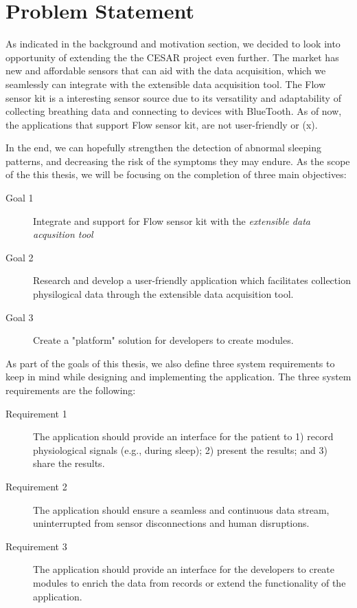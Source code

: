 \section{Problem Statement}

As indicated in the background and motivation section, we decided to look into opportunity of extending the the CESAR project even further. The market has new and affordable sensors that can aid with the data acquisition, which we seamlessly can integrate with the extensible data acquisition tool. The Flow sensor kit is a interesting sensor source due to its versatility and adaptability of collecting breathing data and connecting to devices with BlueTooth. As of now, the applications that support Flow sensor kit, are not user-friendly or (x). 

In the end, we can hopefully strengthen the detection of abnormal sleeping patterns, and decreasing the risk of the symptoms they may endure. As the scope of the this thesis, we will be focusing on the completion of three main objectives:

\begin{description}
    \item[Goal 1] Integrate and support for Flow sensor kit with the \textit{extensible data acqusition tool}
    \item[Goal 2] Research and develop a user-friendly application which facilitates collection physilogical data through the extensible data acquisition tool.
    \item[Goal 3] Create a "platform" solution for developers to create modules. 
\end{description}

As part of the goals of this thesis, we also define three system requirements to keep in mind while designing and implementing the application. The three system requirements are the following: 

\begin{description}
    \item[Requirement 1] The application should provide an interface for the patient to 1) record physiological signals (e.g., during sleep); 2) present the results; and 3) share the results.
    \item[Requirement 2] The application should ensure a seamless and continuous data stream, uninterrupted from sensor disconnections and human disruptions.
    \item[Requirement 3] The application should provide an interface for the developers to create modules to enrich the data from records or extend the functionality of the application.
\end{description}
